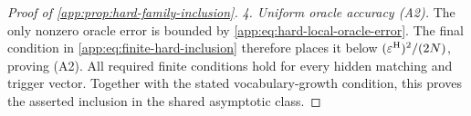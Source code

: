 \begin{proof}[Proof of \cref{app:prop:hard-family-inclusion}]
\emph{4. Uniform oracle accuracy (A2).}
The only nonzero oracle error is bounded by
\eqref{app:eq:hard-local-oracle-error}.  The final condition in
\eqref{app:eq:finite-hard-inclusion} therefore places it below
\((\varepsilon^{\mathrm H})^2/(2N)\), proving (A2).  All required finite conditions hold
for every hidden matching and trigger vector.  Together with the stated
vocabulary-growth condition, this proves the asserted inclusion in the
shared asymptotic class.
\end{proof}
